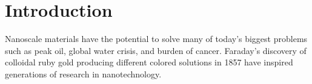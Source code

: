 \section{Introduction}

Nanoscale materials have the potential to solve many of today's biggest problems such as peak oil, global water crisis, and burden of cancer.
Faraday's discovery of colloidal ruby gold producing different colored solutions in 1857 have inspired generations of research in nanotechnology.
  